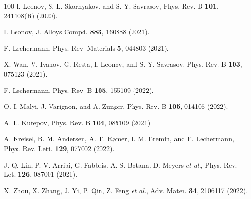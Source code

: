 \documentclass[prl,twocolumn,preprintnumbers,superscriptaddress]{revtex4-1}
\begin{document}
\begin{thebibliography}{100}
I. Leonov, S. L. Skornyakov, and S. Y. Savrasov, Phys. Rev. B \textbf{101}, 241108(R) (2020).

I. Leonov, J. Alloys Compd. \textbf{883}, 160888 (2021).

F. Lechermann, Phys. Rev. Materials \textbf{5}, 044803 (2021).

X. Wan, V. Ivanov, G. Resta, I. Leonov, and S. Y. Savrasov, Phys. Rev. B \textbf{103}, 075123 (2021).

F. Lechermann, Phys. Rev. B \textbf{105}, 155109 (2022).

O. I. Malyi, J. Varignon, and A. Zunger, Phys. Rev. B \textbf{105}, 014106 (2022).

A. L. Kutepov, Phys. Rev. B \textbf{104}, 085109 (2021).

A. Kreisel, B. M. Andersen, A. T. R\o{}mer, I. M. Eremin, and F. Lechermann,
Phys. Rev. Lett. \textbf{129}, 077002 (2022).

J. Q. Lin, P. V. Arribi, G. Fabbris, A. S. Botana, D. Meyers \emph{et al.}, %
Phys. Rev. Let. \textbf{126}, 087001 (2021).

X. Zhou, X. Zhang, J. Yi, P. Qin, Z. Feng \emph{et al.}, Adv. Mater. \textbf{34}, 2106117 (2022).


\end{thebibliography}
\end{document}
